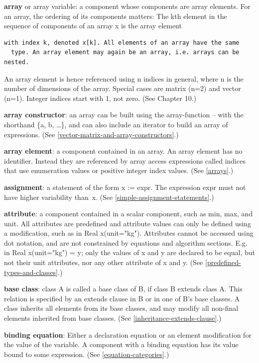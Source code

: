 \documentclass[10pt,a4paper]{report}
\begin{document}
\textbf{array} or array variable: a component whose components are array
elements. For an array, the ordering of its components matters: The kth
element in the sequence of components of an array x is the array element
\begin{lstlisting}[language=modelica]
  with index k, denoted x[k]. All elements of an array have the same
  type. An array element may again be an array, i.e. arrays can be nested.
\end{lstlisting}
An array element is hence referenced using n indices in general, where n
is the number of dimensions of the array. Special cases are matrix (n=2)
and vector (n=1). Integer indices start with 1, not zero. (See Chapter
10.)

\textbf{array constructor}: an array can be built using the
array-function -- with the shorthand \{a, b, \ldots{}\}, and can also
include an iterator to build an array of expressions. (See \ref{vector-matrix-and-array-constructors}.)

\textbf{array element}: a component contained in an array. An array
element has no identifier. Instead they are referenced by array access
expressions called indices that use enumeration values or positive
integer index values. (See \ref{arrays}.)

\textbf{assignment}: a statement of the form x := expr. The expression
expr must not have higher variability than~x. (See \ref{simple-assignment-statements}.)

\textbf{attribute}: a component contained in a scalar component, such as
min, max, and unit. All attributes are predefined and attribute values
can only be defined using a modification, such as in Real x(unit="kg").
Attributes cannot be accessed using dot notation, and are not
constrained by equations and algorithm sections. E.g. in Real
x(unit="kg") = y; only the values of x and y are declared to be equal,
but not their unit attributes, nor any other attribute of x and y. (See
\ref{predefined-types-and-classes}.)

\textbf{base class}: class A is called a base class of B, if class B
extends class A. This relation is specified by an extends clause in B or
in one of B's base classes. A class inherits all elements from its base
classes, and may modify all non-final elements inherited from base
classes. (See \ref{inheritance-extends-clause}.)

\textbf{binding equation}: Either a declaration equation or an element
modification for the value of the variable. A component with a binding
equation has its value bound to some expression. (See \ref{equation-categories}.)
\end{document}
